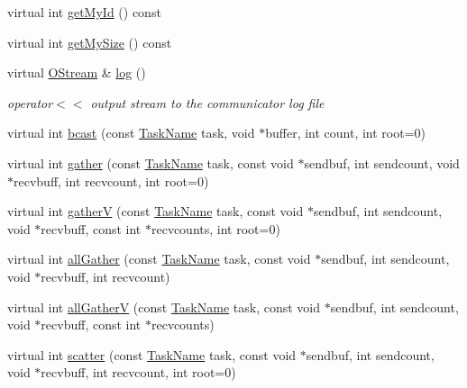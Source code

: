 \begin{DoxyCompactItemize}
\item 
virtual int \hyperlink{classHSF_1_1Communicator_a49da303dc707182ac09c2021a7b36619}{getMyId} () const 
\item 
virtual int \hyperlink{classHSF_1_1Communicator_a064ce6664bdb8aaff6ddd1db54bd10ab}{getMySize} () const 
\item 
virtual \hyperlink{classHSF_1_1OStream}{OStream} \& \hyperlink{classHSF_1_1Communicator_a80806fd26dfa925ef6fb55cee2cb74f5}{log} ()
\begin{DoxyCompactList}\small\item\em operator$<$$<$ output stream to the communicator log file \item\end{DoxyCompactList}\item 
virtual int \hyperlink{classHSF_1_1Communicator_aff3c788234ad6dfa837be18776f84690}{bcast} (const \hyperlink{namespaceHSF_a928eb958edfcd09f62de19e9cd3bac70}{TaskName} task, void $\ast$buffer, int count, int root=0)
\item 
virtual int \hyperlink{classHSF_1_1Communicator_ae4b80c741ad3afd2d0a7ec72c6f16624}{gather} (const \hyperlink{namespaceHSF_a928eb958edfcd09f62de19e9cd3bac70}{TaskName} task, const void $\ast$sendbuf, int sendcount, void $\ast$recvbuff, int recvcount, int root=0)
\item 
virtual int \hyperlink{classHSF_1_1Communicator_a8cd4f1f50d2c24fd0b3bc1bf3a30b8e0}{gatherV} (const \hyperlink{namespaceHSF_a928eb958edfcd09f62de19e9cd3bac70}{TaskName} task, const void $\ast$sendbuf, int sendcount, void $\ast$recvbuff, const int $\ast$recvcounts, int root=0)
\item 
virtual int \hyperlink{classHSF_1_1Communicator_a1d5b58afa61131c24cf2c193a1959d35}{allGather} (const \hyperlink{namespaceHSF_a928eb958edfcd09f62de19e9cd3bac70}{TaskName} task, const void $\ast$sendbuf, int sendcount, void $\ast$recvbuff, int recvcount)
\item 
virtual int \hyperlink{classHSF_1_1Communicator_a4c1230db745ac434c7ccf883ec385ac0}{allGatherV} (const \hyperlink{namespaceHSF_a928eb958edfcd09f62de19e9cd3bac70}{TaskName} task, const void $\ast$sendbuf, int sendcount, void $\ast$recvbuff, const int $\ast$recvcounts)
\item 
virtual int \hyperlink{classHSF_1_1Communicator_ad7b0160f042fe3574068ca4ffd344fbd}{scatter} (const \hyperlink{namespaceHSF_a928eb958edfcd09f62de19e9cd3bac70}{TaskName} task, const void $\ast$sendbuf, int sendcount, void $\ast$recvbuff, int recvcount, int root=0)
\item 

\end{DoxyCompactItemize}
